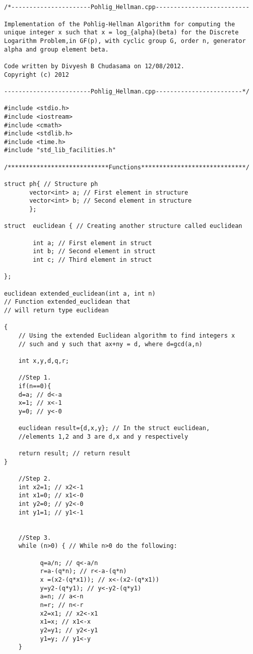\documentclass[iwp,first]{luthesis}
\begin{document}
\begin{verbatim}


/*----------------------Pohlig_Hellman.cpp--------------------------

Implementation of the Pohlig-Hellman Algorithm for computing the 
unique integer x such that x = log_{alpha}(beta) for the Discrete 
Logarithm Problem,in GF(p), with cyclic group G, order n, generator 
alpha and group element beta.

Code written by Divyesh B Chudasama on 12/08/2012.
Copyright (c) 2012

------------------------Pohlig_Hellman.cpp------------------------*/

#include <stdio.h>
#include <iostream>
#include <cmath>
#include <stdlib.h>
#include <time.h>
#include "std_lib_facilities.h"

/****************************Functions*****************************/

struct ph{ // Structure ph
       vector<int> a; // First element in structure
       vector<int> b; // Second element in structure
       };
       
struct  euclidean { // Creating another structure called euclidean
        
        int a; // First element in struct 
        int b; // Second element in struct
        int c; // Third element in struct
        
};

euclidean extended_euclidean(int a, int n) 
// Function extended_euclidean that 
// will return type euclidean

{
    // Using the extended Euclidean algorithm to find integers x 
    // such and y such that ax+ny = d, where d=gcd(a,n)

    int x,y,d,q,r;
    
    //Step 1.  
    if(n==0){ 
    d=a; // d<-a
    x=1; // x<-1
    y=0; // y<-0
    
    euclidean result={d,x,y}; // In the struct euclidean, 
    //elements 1,2 and 3 are d,x and y respectively
    
    return result; // return result
}
    
    //Step 2.
    int x2=1; // x2<-1
    int x1=0; // x1<-0
    int y2=0; // y2<-0
    int y1=1; // y1<-1
   
    
    //Step 3.
    while (n>0) { // While n>0 do the following:
          
          q=a/n; // q<-a/n
          r=a-(q*n); // r<-a-(q*n)
          x =(x2-(q*x1)); // x<-(x2-(q*x1))
          y=y2-(q*y1); // y<-y2-(q*y1)
          a=n; // a<-n
          n=r; // n<-r
          x2=x1; // x2<-x1
          x1=x; // x1<-x
          y2=y1; // y2<-y1
          y1=y; // y1<-y
    }
    

\end{verbatim}
\end{document}
